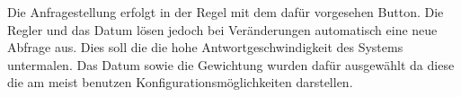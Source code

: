 Die Anfragestellung erfolgt in der Regel mit dem dafür vorgesehen Button. Die Regler und das Datum lösen jedoch bei Veränderungen automatisch eine neue Abfrage aus. Dies soll die  die hohe Antwortgeschwindigkeit des Systems untermalen. Das Datum sowie die Gewichtung wurden dafür ausgewählt da diese die am meist benutzen Konfigurationsmöglichkeiten darstellen.